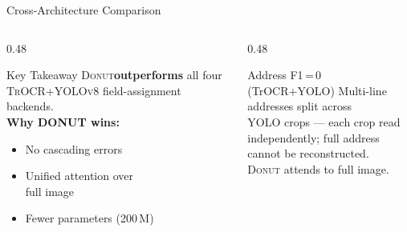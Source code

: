 \documentclass[aspectratio=169,11pt]{beamer}
\newcommand{\donut}{\textsc{Donut}\xspace}
\newcommand{\trocr}{\textsc{TrOCR}\xspace}
\newcommand{\yolo}{\textsc{YOLOv8}\xspace}
\newcommand{\greenbf}[1]{\textcolor{GoodGreen}{\textbf{#1}}}
\begin{document}
\begin{frame}{Cross-Architecture Comparison}
  \vspace{0.3cm}
  \begin{columns}[T]
    \begin{column}{0.48\textwidth}
      \begin{exampleblock}{Key Takeaway}
        \donut \greenbf{outperforms} all four \trocr+\yolo
        field-assignment backends.\\[4pt]
        \textbf{Why DONUT wins:}
        \begin{itemize}
          \item No cascading errors
          \item Unified attention over\\full image
          \item Fewer parameters (200\,M)
        \end{itemize}
      \end{exampleblock}
    \end{column}
    \begin{column}{0.48\textwidth}
      \begin{alertblock}{Address F1\,=\,0 (TrOCR+YOLO)}
        Multi-line addresses split across\\
        YOLO crops — each crop read\\
        independently; full address\\
        cannot be reconstructed.\\[3pt]
        \donut attends to full image.
      \end{alertblock}
    \end{column}
  \end{columns}
\end{frame}
\end{document}
